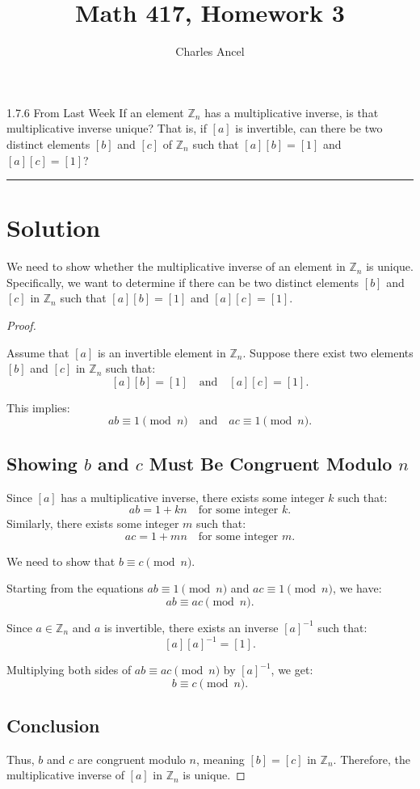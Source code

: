 \documentclass[12pt]{amsart}
\title{Math 417, Homework 3}
\author{Charles Ancel}
\theoremstyle{definition}
\numberwithin{equation}{section}
\newcommand{\Z}{\mathbb{Z}}
\begin{document}
\maketitle

\begin{exercise}{1.7.6 From Last Week} 
If an element \(\Z_n\) has a multiplicative inverse, is that multiplicative inverse unique? That is, if \([a]\) is invertible, can there be two distinct elements \([b]\) and \([c]\) of \(\Z_n\) such that \([a][b] = [1]\) and \([a][c] = [1]\)?

\noindent\rule{\linewidth}{1pt}

\section*{Solution}

We need to show whether the multiplicative inverse of an element in \(\mathbb{Z}_n\) is unique. Specifically, we want to determine if there can be two distinct elements \([b]\) and \([c]\) in \(\mathbb{Z}_n\) such that \([a][b] = [1]\) and \([a][c] = [1]\).

\begin{proof} \( \)

Assume that \([a]\) is an invertible element in \(\mathbb{Z}_n\). Suppose there exist two elements \([b]\) and \([c]\) in \(\mathbb{Z}_n\) such that:
\[
[a][b] = [1] \quad \text{and} \quad [a][c] = [1].
\]

This implies:
\[
ab \equiv 1 \pmod{n} \quad \text{and} \quad ac \equiv 1 \pmod{n}.
\]

\subsection*{Showing \(b\) and \(c\) Must Be Congruent Modulo \(n\)}
Since \([a]\) has a multiplicative inverse, there exists some integer \(k\) such that:
\[
ab = 1 + kn \quad \text{for some integer } k.
\]
Similarly, there exists some integer \(m\) such that:
\[
ac = 1 + mn \quad \text{for some integer } m.
\]

We need to show that \(b \equiv c \pmod{n}\).

Starting from the equations \(ab \equiv 1 \pmod{n}\) and \(ac \equiv 1 \pmod{n}\), we have:
\[
ab \equiv ac \pmod{n}.
\]

Since \(a \in \mathbb{Z}_n\) and \(a\) is invertible, there exists an inverse \([a]^{-1}\) such that:
\[
[a][a]^{-1} = [1].
\]

Multiplying both sides of \(ab \equiv ac \pmod{n}\) by \([a]^{-1}\), we get:
\[
b \equiv c \pmod{n}.
\]

\subsection*{Conclusion}
Thus, \(b\) and \(c\) are congruent modulo \(n\), meaning \([b] = [c]\) in \(\mathbb{Z}_n\). Therefore, the multiplicative inverse of \([a]\) in \(\mathbb{Z}_n\) is unique.

\end{proof}
\end{exercise}
\newpage
\end{document}
